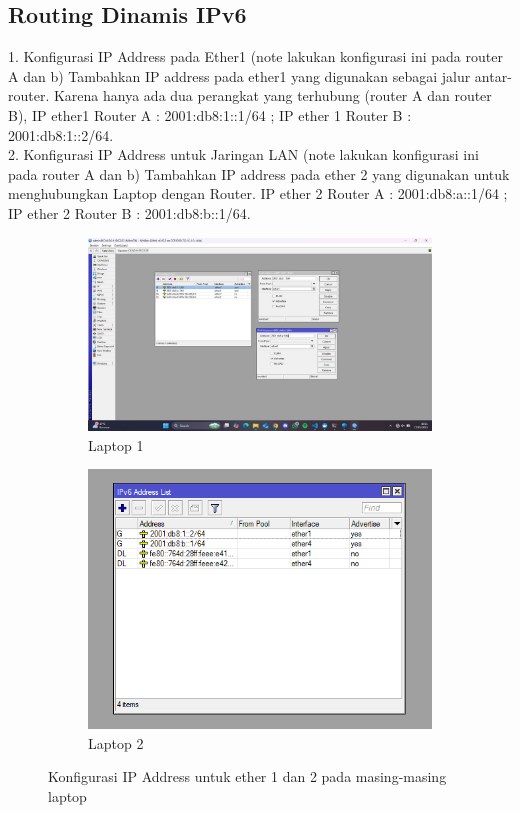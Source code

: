 \subsection{Routing Dinamis IPv6}
1. Konfigurasi IP Address pada Ether1 (note lakukan konfigurasi ini pada router A dan b) Tambahkan IP address pada ether1 yang digunakan sebagai jalur antar-router. Karena hanya ada dua perangkat yang terhubung (router A dan router B), IP ether1 Router A : 2001:db8:1::1/64 ; IP ether 1 Router B : 2001:db8:1::2/64. \\
2. Konfigurasi IP Address untuk Jaringan LAN (note lakukan konfigurasi ini pada router A dan b) Tambahkan IP address pada ether 2 yang digunakan untuk menghubungkan Laptop dengan Router. IP ether 2 Router A : 2001:db8:a::1/64 ; IP ether 2 Router B : 2001:db8:b::1/64.
\begin{figure}[H]
    \centering
    \begin{subfigure}[b]{0.3\linewidth}
      \centering
      \includegraphics[width=\linewidth]{image/statis2.jpg}
      \caption{Laptop 1}
    \end{subfigure}
    \hspace{1cm}
    \begin{subfigure}[b]{0.3\linewidth}
      \centering
      \includegraphics[width=\linewidth]{image/statis1.png}
      \caption{Laptop 2}
    \end{subfigure}
    \caption{Konfigurasi IP Address untuk ether 1 dan 2 pada masing-masing laptop}
\end{figure}
